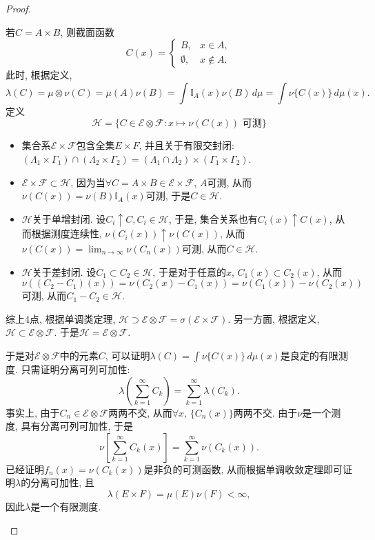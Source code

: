 \documentclass[UTF8, a4paper]{article}
\begin{document}
\begin{proof}
\begin{enumerate}[a)]
若\(C = A\times B\), 则截面函数
$$
C(x) = \begin{cases}
    B,  & x\in A, \\
    \emptyset, & x\notin A.
\end{cases} 
$$
此时, 根据定义, 
$$
\lambda(C) = \mu \otimes \nu (C) = \mu(A) \nu(B) = \int \mathbb{I}_A(x) \nu(B) \, d\mu = \int \nu\{C(x)\} \, d\mu(x).
$$
定义 
$$
\mathcal{H}  = \{C \in \mathcal{E} \otimes \mathcal{F}: x \mapsto \nu(C(x)) \text{ 可测}\}
$$
\begin{itemize}
    \item 集合系\(\mathcal{E} \times \mathcal{F}\)包含全集\(E \times F\), 并且关于有限交封闭: \((\Lambda_1 \times \Gamma_1) \cap (\Lambda_2 \times \Gamma_2) = (\Lambda_1 \cap \Lambda_2) \times (\Gamma_1 \times \Gamma_2)\).
    \item \(\mathcal{E} \times \mathcal{F} \subset \mathcal{H}\), 因为当\(\forall C = A\times B \in \mathcal{E} \times \mathcal{F}\), \(A\)可测, 从而\(\nu(C(x)) = \nu(B) \mathbb{I}_A(x)\)可测, 于是\(C \in \mathcal{H}\).
    \item \(\mathcal{H}\)关于单增封闭. 设\(C_i \uparrow C, C_i \in \mathcal{H}\), 于是, 集合关系也有\(C_i(x) \uparrow C(x)\), 从而根据测度连续性, \(\nu(C_i(x)) \uparrow \nu(C(x))\), 从而\(\nu(C(x)) = \lim_{n\to \infty} \nu(C_n(x))\)可测, 从而\(C\in \mathcal{H}\).
    \item \(\mathcal{H}\)关于差封闭. 设\(C_1 \subset C_2 \in \mathcal{H}\), 于是对于任意的\(x\), \(C_1(x) \subset C_2(x)\), 从而\(\nu((C_2 - C_1)(x)) = \nu(C_2(x) - C_1(x)) = \nu(C_1(x)) - \nu(C_2(x))\)可测, 从而\(C_1 - C_2 \in \mathcal{H}\).
\end{itemize}
综上4点, 根据单调类定理, \(\mathcal{H} \supset \mathcal{E} \otimes \mathcal{F} = \sigma(\mathcal{E} \times \mathcal{F})\).
另一方面, 根据定义, \(\mathcal{H} \subset \mathcal{E} \otimes \mathcal{F}\). 于是\(\mathcal{H} = \mathcal{E} \otimes \mathcal{F}\).

于是对\(\mathcal{E} \otimes \mathcal{F}\)中的元素\(C\), 可以证明\(\lambda(C) = \int \nu \{C(x)\} \,d\mu(x)\)是良定的有限测度. 只需证明分离可列可加性:
$$
\lambda\left(\sum_{k=1}^{\infty} C_k\right) = \sum_{k=1}^{\infty} \lambda(C_k).
$$
事实上, 由于\(C_n \in \mathcal{E} \otimes \mathcal{F}\)两两不交, 从而\(\forall x\), \(\{C_n(x)\}\)两两不交.
由于\(\nu\)是一个测度, 具有分离可列可加性, 于是$$
\nu\left[\sum_{k=1}^{\infty} C_k(x)\right] = \sum_{k=1}^{\infty} \nu(C_k(x)).
$$
已经证明\(f_n(x) =  \nu(C_k(x))\)是非负的可测函数, 从而根据单调收敛定理即可证明\(\lambda\)的分离可加性, 
且$$
\lambda(E \times F) = \mu(E) \nu(F) < \infty,
$$
因此\(\lambda\)是一个有限测度.


\end{enumerate}
\end{proof}
\end{document}
